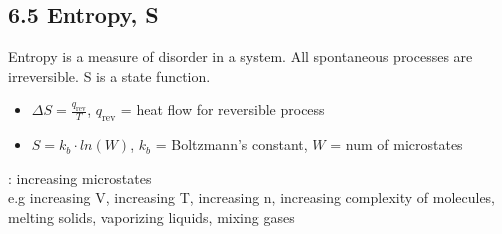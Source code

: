 \subsection{6.5 Entropy, S}
    \vspace*{0.2em}
    Entropy is a measure of disorder in a system. All spontaneous processes are irreversible. S is a state function.
    \begin{itemize}
        \item $\Delta S = \frac{q_\text{rev}}{T}$, $q_\text{rev}$ = heat flow for reversible process
        \item $S = k_b \cdot ln(W)$, $k_b$ = Boltzmann's constant, $W$ = num of microstates
    \end{itemize}
    : increasing microstates\\
    e.g increasing V, increasing T, increasing n, increasing complexity of molecules, melting solids, vaporizing liquids, mixing gases